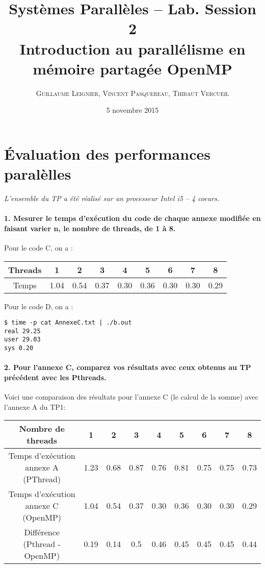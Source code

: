 \documentclass[letterpaper,12pt]{article}
\newcommand{\question}[1]{\paragraph{#1\\ \vspace{0.5cm}}}
\begin{document}
\title{Systèmes Parallèles -- Lab. Session 2\\
\vspace{0.5cm}
Introduction au parallélisme en mémoire partagée
OpenMP}
\author{\textsc{Guillaume Leignier, Vincent Pasquereau, Thibaut Vercueil}}
\date{5 novembre 2015}
\maketitle
\tableofcontents

\newpage
\section{Évaluation des performances paralèlles}
\textit{L'ensemble du TP a été réalisé sur un processeur Intel i5 -- 4 coeurs.}

\paragraph{1.  Mesurer le temps d’exécution du code de chaque annexe modifiée en faisant varier n, le nombre de threads, de 1 à 8.}

Pour le code C, on a :\\

\begin{center}
\begin{tabular}{|c||c|c|c|c|c|c|c|c|}
  \hline
  Threads & 1 & 2 & 3 & 4 & 5 & 6 & 7 & 8 \\
  \hline
  Temps & 1.04 & 0.54 & 0.37 & 0.30 & 0.36 & 0.30 & 0.30 & 0.29 \\
  \hline 
\end{tabular}
\end{center}


\vspace{1cm}
Pour le code D, on a :\\ 

\begin{lstlisting}[style=BASH]
$ time -p cat AnnexeC.txt | ./b.out 
real 29.25
user 29.03
sys 0.20
\end{lstlisting}


\question{2. Pour l’annexe C, comparez vos résultats avec ceux obtenus au TP précédent avec les Pthreads.}


Voici une comparaison des résultats pour l'annexe C (le calcul de la somme) avec l'annexe A du TP1:


\begin{center}
\begin{tabular}{|c||c|c|c|c|c|c|c|c|}
  \hline
   Nombre de threads & 1 & 2 & 3 & 4 & 5 & 6 & 7 & 8 \\
  \hline
   Temps d'exécution annexe A (PThread) & 1.23 & 0.68 & 0.87 & 0.76 & 0.81 & 0.75 & 0.75 & 0.73 \\
  \hline 
  Temps d'exécution annexe C (OpenMP) & 1.04 & 0.54 & 0.37 & 0.30 & 0.36 & 0.30 & 0.30 & 0.29 \\
  \hline
 Différence (Pthread - OpenMP) & 0.19 & 0.14 & 0.5 & 0.46 & 0.45 & 0.45 & 0.45 & 0.44 \\
 \hline 
\end{tabular}
\end{center}
\end{document}
